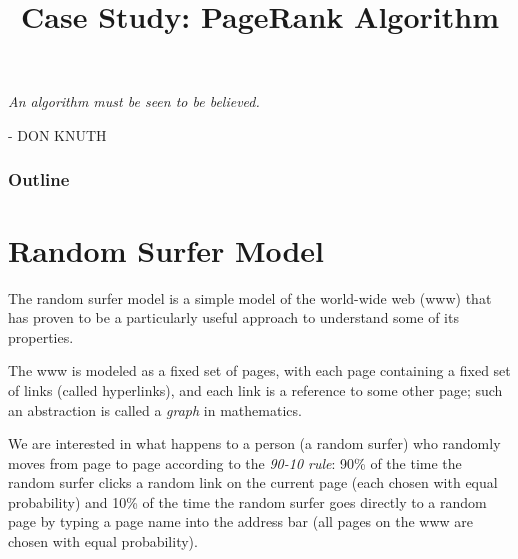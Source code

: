 \documentclass[8pt,a4paper,compress,handout]{beamer}
\title{Case Study: PageRank Algorithm}
\date{}
\begin{document}
\begin{frame}
\hfill
\begin{minipage}{150pt}
\begin{flushright}
\tiny \emph{An algorithm must be seen to be believed.}

\smallskip

- DON KNUTH
\end{flushright}
\end{minipage}
\vfill
\titlepage
\end{frame}

\begin{frame}
\frametitle{Outline}
\tableofcontents
\end{frame}

\section{Random Surfer Model}
\begin{frame}[fragile]
\pause

The random surfer model is a simple model of the world-wide web (www) that has proven to be a particularly useful approach to understand some of its properties.

\bigskip

The www is modeled as a fixed set of pages, with each page containing a fixed set of links (called hyperlinks), and each link is a reference to some other page; such an abstraction is called a \textit{graph} in mathematics.

\bigskip

We are interested in what happens to a person (a random surfer) who randomly moves from page to page according to the \emph{90-10 rule}: 90\% of the time the random surfer clicks a random link on the current page (each chosen with equal probability) and 10\% of the time the random surfer goes directly to a random page by typing a page name into the address bar (all pages on the www are chosen with equal probability).
\end{frame}
\end{document}
